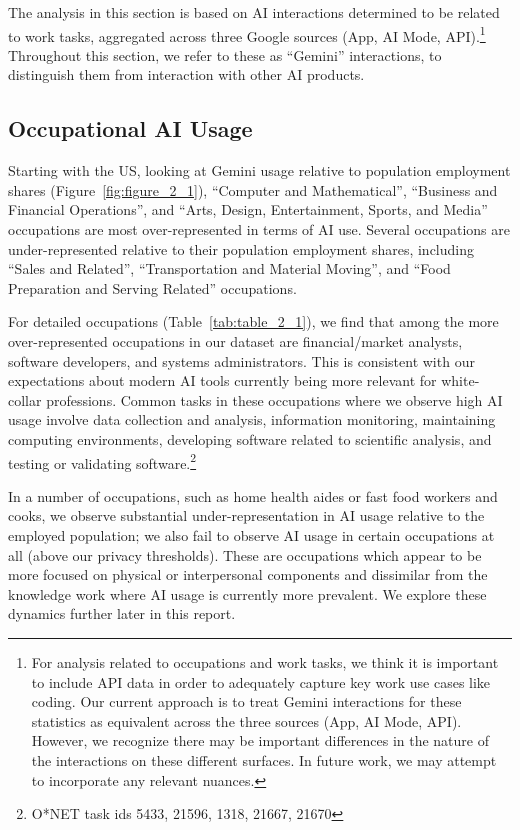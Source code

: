 \documentclass[11pt,a4paper]{article}
\begin{document}
The analysis in this section is based on AI interactions determined to be related to work tasks, aggregated across three Google sources (App, AI Mode, API).\footnote{For analysis related to occupations and work tasks, we think it is important to include API data in order to adequately capture key work use cases like coding. Our current approach is to treat Gemini interactions for these statistics as equivalent across the three sources (App, AI Mode, API). However, we recognize there may be important differences in the nature of the interactions on these different surfaces. In future work, we may attempt to incorporate any relevant nuances.} Throughout this section, we refer to these as ``Gemini'' interactions, to distinguish them from interaction with other AI products.

\subsection{Occupational AI Usage}

Starting with the US, looking at Gemini usage relative to population employment shares (Figure~\ref{fig:figure_2_1}), ``Computer and Mathematical'', ``Business and Financial Operations'', and ``Arts, Design, Entertainment, Sports, and Media'' occupations are most over-represented in terms of AI use. Several occupations are under-represented relative to their population employment shares, including ``Sales and Related'', ``Transportation and Material Moving'', and ``Food Preparation and Serving Related'' occupations.

For detailed occupations (Table~\ref{tab:table_2_1}), we find that among the more over-represented occupations in our dataset are financial/market analysts, software developers, and systems administrators. This is consistent with our expectations about modern AI tools currently being more relevant for white-collar professions. Common tasks in these occupations where we observe high AI usage involve data collection and analysis, information monitoring, maintaining computing environments, developing software related to scientific analysis, and testing or validating software.\footnote{O*NET task ids 5433, 21596, 1318, 21667, 21670}

In a number of occupations, such as home health aides or fast food workers and cooks, we observe substantial under-representation in AI usage relative to the employed population; we also fail to observe AI usage in certain occupations at all (above our privacy thresholds). These are occupations which appear to be more focused on physical or interpersonal components and dissimilar from the knowledge work where AI usage is currently more prevalent. We explore these dynamics further later in this report.
\end{document}
